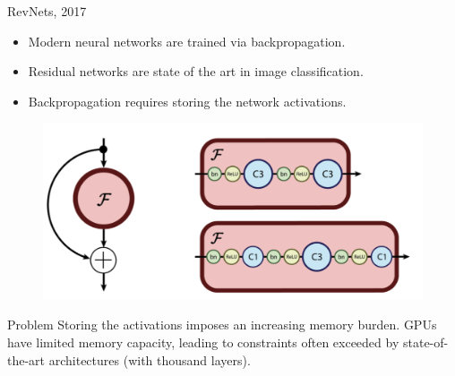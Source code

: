 \begin{frame}{RevNets, 2017}
	\begin{minipage}[t]{0.6\columnwidth}
		\begin{itemize}
			\item Modern neural networks are trained via backpropagation.
			\item Residual networks are state of the art in image classification.
			\item Backpropagation requires storing the network activations.
		\end{itemize}
	\end{minipage}%
	\begin{minipage}[t]{0.4\columnwidth}
		\begin{figure}
			\centering
			\includegraphics[width=\linewidth]{figs/resnet_block.png}
		\end{figure}
	\end{minipage}
	\vspace{0.1cm}
	\begin{block}{Problem}
		Storing the activations imposes an increasing memory burden. GPUs have limited memory capacity, leading to constraints often exceeded by state-of-the-art architectures (with thousand layers).
	\end{block}
\end{frame}
